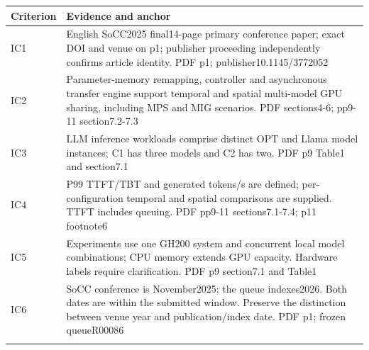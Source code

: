 \begin{longtable}{>{\raggedright\arraybackslash}p{}>{\raggedright\arraybackslash}p{}}
\toprule
\textbf{Criterion} & \textbf{Evidence and anchor}\\\midrule\endhead
IC1 & English SoCC2025 final14-page primary conference paper;\allowbreak{} exact DOI and venue on p1;\allowbreak{} publisher proceeding independently confirms article identity. PDF p1;\allowbreak{} publisher10.1145/3772052\\\addlinespace
IC2 & Parameter-memory remapping,\allowbreak{} controller and asynchronous transfer engine support temporal and spatial multi-model GPU sharing,\allowbreak{} including MPS and MIG scenarios. PDF sections4-6;\allowbreak{} pp9-11 section7.2-7.3\\\addlinespace
IC3 & LLM inference workloads comprise distinct OPT and Llama model instances;\allowbreak{} C1 has three models and C2 has two. PDF p9 Table1 and section7.1\\\addlinespace
IC4 & P99 TTFT/TBT and generated tokens/s are defined;\allowbreak{} per-configuration temporal and spatial comparisons are supplied. TTFT includes queuing. PDF pp9-11 sections7.1-7.4;\allowbreak{} p11 footnote6\\\addlinespace
IC5 & Experiments use one GH200 system and concurrent local model combinations;\allowbreak{} CPU memory extends GPU capacity. Hardware labels require clarification. PDF p9 section7.1 and Table1\\\addlinespace
IC6 & SoCC conference is November2025;\allowbreak{} the queue indexes2026. Both dates are within the submitted window. Preserve the distinction between venue year and publication/index date. PDF p1;\allowbreak{} frozen queueR00086\\\addlinespace
\bottomrule\end{longtable}
